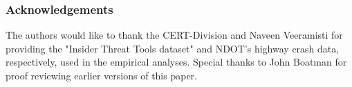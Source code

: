 \documentclass[letterpaper]{article}
\begin{document}
\newpage

\subsubsection*{Acknowledgements}

The authors would like to thank the CERT-Division and Naveen Veeramisti for providing the "Insider Threat Tools dataset" and NDOT's highway crash data, respectively, used in the empirical analyses. Special thanks to John Boatman for proof reviewing earlier versions of this paper.










\end{document}
